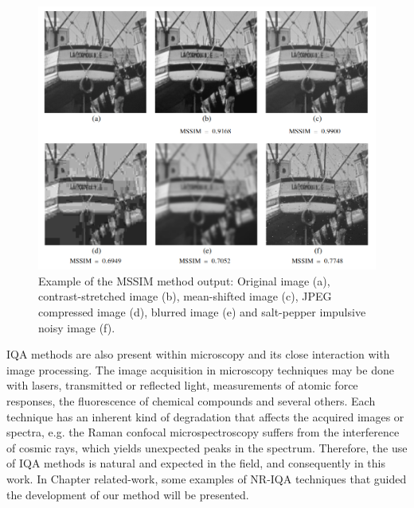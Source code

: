 \begin{figure}[H]
	\centering
	\caption{\label{fig:mssim_IQA_exampe} Example of the MSSIM method output: Original image (a), contrast-stretched image (b), mean-shifted image (c), JPEG compressed image (d), blurred image (e) and salt-pepper impulsive noisy image (f).}
	\begin{center}
    \includegraphics[scale=0.45]{images/mssim_IQA.png}
	\end{center}
	\centering
\end{figure}

IQA methods are also present within microscopy and its close interaction with image processing. The image acquisition in microscopy techniques may be done with lasers, transmitted or reflected light, measurements of atomic force responses, the fluorescence of chemical compounds and several others. Each technique has an inherent kind of degradation that affects the acquired images or spectra, e.g. the Raman confocal microspectroscopy suffers from the interference of cosmic rays, which yields unexpected peaks in the spectrum. Therefore, the use of IQA methods is natural and expected in the field, and consequently in this work. In 
{\color{red}Chapter related-work}, some examples of NR-IQA techniques that guided the development of our method will be presented.